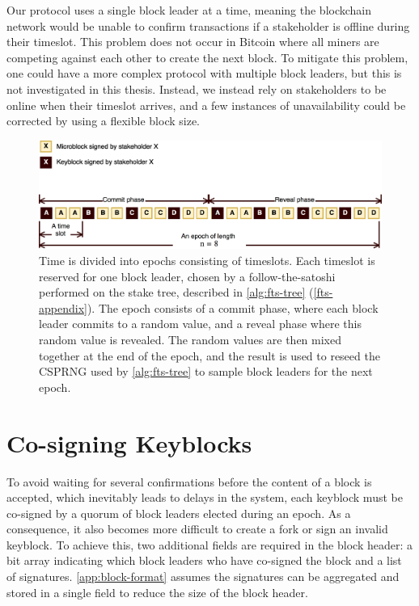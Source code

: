 \documentclass{style/kththesis}
\begin{document}
Our protocol uses a single block leader at a time, meaning the blockchain network would be unable to confirm transactions if a stakeholder is offline during their timeslot. This problem does not occur in Bitcoin where all miners are competing against each other to create the next block. To mitigate this problem, one could have a more complex protocol with multiple block leaders, but this is not investigated in this thesis. Instead, we instead rely on stakeholders to be online when their timeslot arrives, and a few instances of unavailability could be corrected by using a flexible block size.

\begin{figure}
    \centering
    \includegraphics[width=\textwidth]{figures/proof-of-stake}
    \caption{Time is divided into epochs consisting of timeslots. Each timeslot is reserved for one block leader, chosen by a follow-the-satoshi performed on the stake tree, described in \cref{alg:fts-tree} (\cref{fts-appendix}). The epoch consists of a commit phase, where each block leader commits to a random value, and a reveal phase where this random value is revealed. The random values are then mixed together at the end of the epoch, and the result is used to reseed the CSPRNG used by \cref{alg:fts-tree} to sample block leaders for the next epoch.}
    \label{fig:pos}
\end{figure}

\section{Co-signing Keyblocks}
To avoid waiting for several confirmations before the content of a block is accepted, which inevitably leads to delays in the system, each keyblock must be co-signed by a quorum of block leaders elected during an epoch. As a consequence, it also becomes more difficult to create a fork or sign an invalid keyblock. To achieve this, two additional fields are required in the block header: a bit array indicating which block leaders who have co-signed the block and a list of signatures. \cref{app:block-format} assumes the signatures can be aggregated and stored in a single field to reduce the size of the block header.
\end{document}
